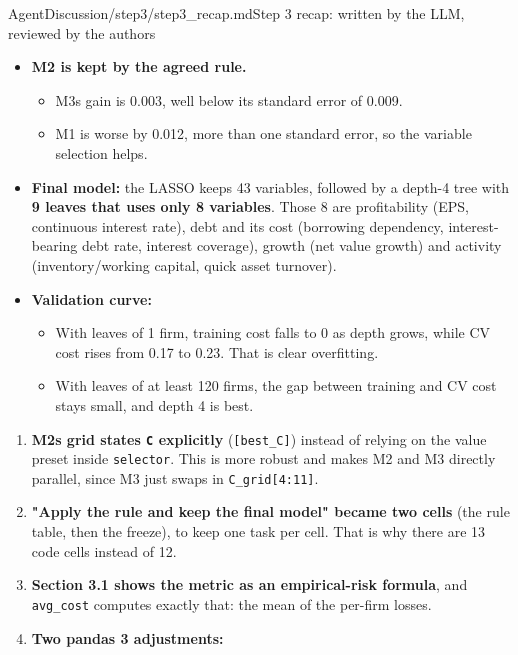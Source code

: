 \begin{mdfile}{AgentDiscussion/\allowbreak{}step3/\allowbreak{}step3\_recap.md}{Step 3 recap: written by the LLM, reviewed by the authors}
\begin{itemize}
\tightlist
\item
  \textbf{M2 is kept by the agreed rule.}

  \begin{itemize}
  \tightlist
  \item
    M3\textquotesingle s gain is 0.003, well below its standard error of 0.009.
  \item
    M1 is worse by 0.012, more than one standard error, so the variable selection helps.
  \end{itemize}
\item
  \textbf{Final model:} the LASSO keeps 43 variables, followed by a depth-4 tree with \textbf{9 leaves that uses only 8 variables}. Those 8 are profitability (EPS, continuous interest rate), debt and its cost (borrowing dependency, interest-bearing debt rate, interest coverage), growth (net value growth) and activity (inventory/working capital, quick asset turnover).
\item
  \textbf{Validation curve:}

  \begin{itemize}
  \tightlist
  \item
    With leaves of 1 firm, training cost falls to 0 as depth grows, while CV cost rises from 0.17 to 0.23. That is clear overfitting.
  \item
    With leaves of at least 120 firms, the gap between training and CV cost stays small, and depth 4 is best.
  \end{itemize}
\end{itemize}


\begin{enumerate}
\def\labelenumi{\arabic{enumi}.}
\tightlist
\item
  \textbf{M2\textquotesingle s grid states \texttt{C} explicitly} (\texttt{{[}best\_C{]}}) instead of relying on the value preset inside \texttt{selector}. This is more robust and makes M2 and M3 directly parallel, since M3 just swaps in \texttt{C\_grid{[}4:11{]}}.
\item
  \textbf{"Apply the rule and keep the final model" became two cells} (the rule table, then the freeze), to keep one task per cell. That is why there are 13 code cells instead of 12.
\item
  \textbf{Section 3.1 shows the metric as an empirical-risk formula}, and \texttt{avg\_cost} computes exactly that: the mean of the per-firm losses.
\item
  \textbf{Two pandas 3 adjustments:}


\end{enumerate}
\end{mdfile}
